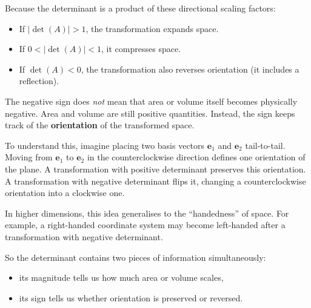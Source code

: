 \documentclass[11pt,openany]{book}
\theoremstyle{definition}
\begin{document}
Because the determinant is a product of these directional scaling factors:

\begin{itemize}
  \item If $|\det(A)| > 1$, the transformation expands space.
  \item If $0 < |\det(A)| < 1$, it compresses space.
  \item If $\det(A) < 0$, the transformation also reverses orientation (it includes a reflection).
\end{itemize}

\medskip

The negative sign does \textit{not} mean that area or volume itself becomes physically
negative. Area and volume are still positive quantities. Instead, the sign keeps track
of the \textbf{orientation} of the transformed space.

\medskip

To understand this, imagine placing two basis vectors $\mathbf{e}_1$ and $\mathbf{e}_2$
tail-to-tail. Moving from $\mathbf{e}_1$ to $\mathbf{e}_2$ in the counterclockwise direction
defines one orientation of the plane. A transformation with positive determinant preserves
this orientation. A transformation with negative determinant flips it, changing a
counterclockwise orientation into a clockwise one.

\medskip

In higher dimensions, this idea generalises to the ``handedness'' of space. For example,
a right-handed coordinate system may become left-handed after a transformation with
negative determinant.

\medskip

So the determinant contains two pieces of information simultaneously:

\begin{itemize}
  \item its magnitude tells us how much area or volume scales,
  \item its sign tells us whether orientation is preserved or reversed.
\end{itemize}
\end{document}
